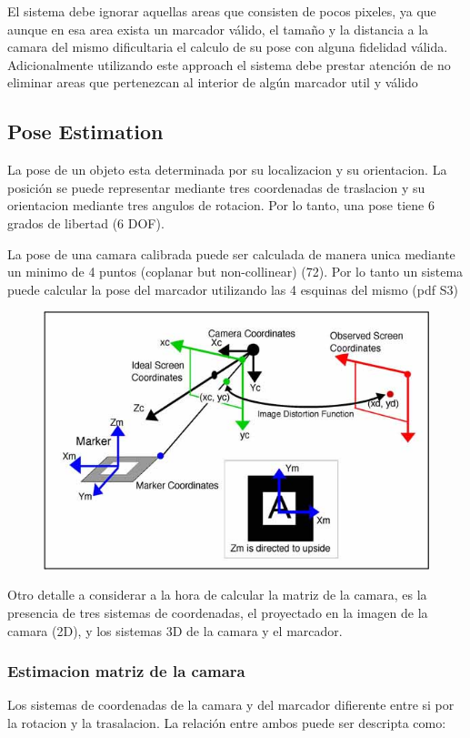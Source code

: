 \documentclass[runningheads]{llncs}
\begin{document}
	El sistema debe ignorar aquellas areas que consisten de pocos pixeles, ya que aunque en esa area exista un marcador válido, el tamaño y la distancia a la camara del mismo dificultaria el calculo de su pose con alguna fidelidad válida. Adicionalmente utilizando este approach el sistema debe prestar atención de no eliminar areas que pertenezcan al interior de algún marcador util y válido
	
	\subsection{Pose Estimation}
	
	La pose de un objeto esta determinada por su localizacion y su orientacion. La posición se puede representar mediante tres coordenadas de traslacion y su orientacion mediante tres angulos de rotacion. Por lo tanto, una pose tiene 6 grados de libertad (6 DOF).
	
	La pose de una camara calibrada puede ser calculada de manera unica mediante un minimo de 4 puntos (coplanar but non-collinear) (72). Por lo tanto un sistema puede calcular la pose del marcador utilizando las 4 esquinas del mismo (pdf S3)
	
	\begin{figure}
		\centering
		\includegraphics[width=0.7\linewidth]{Imagenes/ar-coordenadas}
		\caption{}
	\label{ar-coordenadas}
	\end{figure}
	
	
	Otro detalle a considerar a la hora de calcular la matriz de la camara, es la presencia de tres sistemas de coordenadas, el proyectado en la imagen de la camara (2D), y los sistemas 3D de la camara y el marcador.
	
	\subsubsection{Estimacion matriz de la camara}
	Los sistemas de coordenadas de la camara y del marcador difierente entre si por la rotacion y la trasalacion. La relación entre ambos puede ser descripta como:
	
\end{document}
